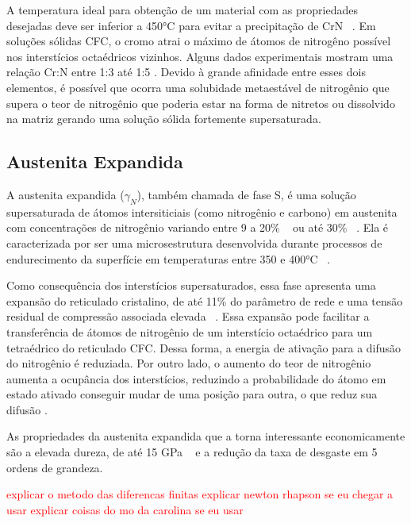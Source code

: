 \documentclass[]{politex}
\newcommand\myworries[1]{\textcolor{red}{#1}}
\begin{document}
	A temperatura ideal para obtenção de um material com as propriedades desejadas deve ser inferior a 450°C para evitar a precipitação de CrN ~\cite{moskalioviene2011modeling}.
	Em soluções sólidas CFC, o cromo atrai o máximo de átomos de nitrogêno possível nos interstícios octaédricos vizinhos. Alguns dados experimentais mostram uma relação Cr:N entre 1:3 até 1:5 \cite{somers2018expanded}. Devido à grande afinidade entre esses dois elementos, é possível que ocorra uma solubidade metaestável de nitrogênio que supera o teor de nitrogênio que poderia estar na forma de nitretos ou dissolvido na matriz gerando uma solução sólida fortemente supersaturada.
	
\subsection{Austenita Expandida}
	A austenita expandida ($\gamma_{N}$), também chamada de fase S,  é uma solução supersaturada de átomos intersiticiais (como nitrogênio e carbono) em austenita com concentrações de nitrogênio variando entre 9 a 20\%  ~\cite{williamson1994metastable} ou até 30\% ~\cite{moskalioviene2011modeling}. Ela é caracterizada por ser uma microsestrutura desenvolvida durante processos de endurecimento da superfície em temperaturas entre 350 e 400°C ~\cite{mandl2003nitrogen}. \par
	Como consequência dos interstícios supersaturados, essa fase apresenta uma expansão do reticulado cristalino, de até 11\% do parâmetro de rede e uma tensão residual de compressão associada elevada ~\cite{somers2018expanded}. Essa expansão pode facilitar a transferência de átomos de nitrogênio de um interstício octaédrico para um tetraédrico do reticulado CFC. Dessa forma, a energia de ativação para a difusão do nitrogênio é reduziada. Por outro lado, o aumento do teor de nitrogênio aumenta a ocupância dos interstícios, reduzindo a probabilidade do átomo em estado ativado conseguir mudar de uma posição para outra, o que reduz sua difusão \cite{christiansen2008nitrogen}. \par
	As propriedades da austenita expandida que a torna interessante economicamente são a elevada dureza, de até 15 GPa ~\cite{mandl2003nitrogen} e a redução da taxa de desgaste em 5 ordens de grandeza.

\myworries{explicar o metodo das diferencas finitas}
\myworries{explicar newton rhapson se eu chegar a usar}
\myworries{explicar coisas do mo da carolina se eu usar}
\end{document}

